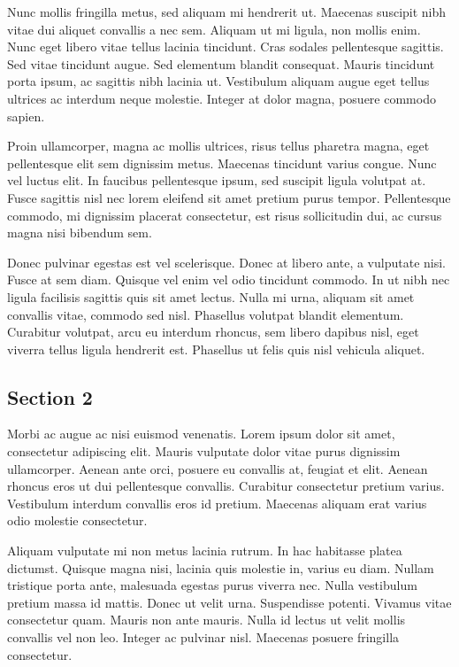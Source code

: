 \par
Nunc mollis fringilla metus, sed aliquam mi hendrerit ut. Maecenas suscipit
nibh vitae dui aliquet convallis a nec sem. Aliquam ut mi ligula, non mollis
enim. Nunc eget libero vitae tellus lacinia tincidunt. Cras sodales
pellentesque sagittis. Sed vitae tincidunt augue. Sed elementum blandit
consequat. Mauris tincidunt porta ipsum, ac sagittis nibh lacinia ut.
Vestibulum aliquam augue eget tellus ultrices ac interdum neque molestie.
Integer at dolor magna, posuere commodo sapien.
\par
Proin ullamcorper, magna ac mollis ultrices, risus tellus pharetra magna, eget
pellentesque elit sem dignissim metus. Maecenas tincidunt varius congue. Nunc
vel luctus elit. In faucibus pellentesque ipsum, sed suscipit ligula volutpat
at. Fusce sagittis nisl nec lorem eleifend sit amet pretium purus tempor.
Pellentesque commodo, mi dignissim placerat consectetur, est risus sollicitudin
dui, ac cursus magna nisi bibendum sem.
\par
Donec pulvinar egestas est vel scelerisque. Donec at libero ante, a vulputate
nisi. Fusce at sem diam. Quisque vel enim vel odio tincidunt commodo. In ut
nibh nec ligula facilisis sagittis quis sit amet lectus. Nulla mi urna, aliquam
sit amet convallis vitae, commodo sed nisl. Phasellus volutpat blandit
elementum. Curabitur volutpat, arcu eu interdum rhoncus, sem libero dapibus
nisl, eget viverra tellus ligula hendrerit est. Phasellus ut felis quis nisl
vehicula aliquet.

\subsection{Section 2}
Morbi ac augue ac nisi euismod venenatis. Lorem ipsum dolor sit amet,
consectetur adipiscing elit. Mauris vulputate dolor vitae purus dignissim
ullamcorper. Aenean ante orci, posuere eu convallis at, feugiat et elit. Aenean
rhoncus eros ut dui pellentesque convallis. Curabitur consectetur pretium
varius. Vestibulum interdum convallis eros id pretium. Maecenas aliquam erat
varius odio molestie consectetur.

\par
Aliquam vulputate mi non metus lacinia rutrum. In hac habitasse platea
dictumst. Quisque magna nisi, lacinia quis molestie in, varius eu diam. Nullam
tristique porta ante, malesuada egestas purus viverra nec. Nulla vestibulum
pretium massa id mattis. Donec ut velit urna. Suspendisse potenti. Vivamus
vitae consectetur quam. Mauris non ante mauris. Nulla id lectus ut velit mollis
convallis vel non leo. Integer ac pulvinar nisl. Maecenas posuere fringilla
consectetur.
